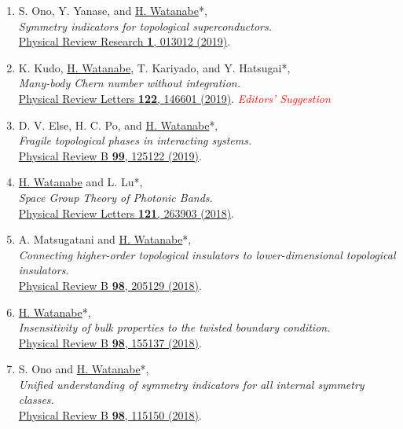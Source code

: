 \documentclass[letterpaper,11pt]{article}
\begin{document}
\begin{enumerate}
\item S. Ono, Y. Yanase, and \underline{H. Watanabe}*, \\\emph{Symmetry indicators for topological superconductors.}\\{\href{https://doi.org/10.1103/PhysRevResearch.1.013012}{Physical Review Research {\bf 1}, 013012 (2019)}.}

\item K. Kudo, \underline{H. Watanabe}, T. Kariyado, and Y. Hatsugai*, \\\emph{Many-body Chern number without integration.}\\{\href{https://doi.org/10.1103/PhysRevLett.122.146601}{Physical Review Letters {\bf 122}, 146601 (2019)}. \emph{\small \textcolor{red}{Editors' Suggestion}}}

\item D. V. Else, H. C. Po, and \underline{H. Watanabe}*, \\\emph{Fragile topological phases in interacting systems.}\\{\href{https://doi.org/10.1103/PhysRevB.99.125122}{Physical Review B {\bf 99}, 125122 (2019)}.}

\item \underline{H. Watanabe} and L. Lu*, \\\emph{Space Group Theory of Photonic Bands.}\\{\href{https://doi.org/10.1103/PhysRevLett.121.263903}{Physical Review Letters {\bf 121}, 263903 (2018)}.}

\item A. Matsugatani and \underline{H. Watanabe}*, \\\emph{Connecting higher-order topological insulators to lower-dimensional topological insulators.}\\{\href{https://doi.org/10.1103/PhysRevB.98.205129}{Physical Review B {\bf 98}, 205129 (2018)}.}

\item \underline{H. Watanabe}*, \\\emph{Insensitivity of bulk properties to the twisted boundary condition.}\\{\href{https://doi.org/10.1103/PhysRevB.98.155137}{Physical Review B {\bf 98}, 155137 (2018)}.}

\item S. Ono and \underline{H. Watanabe}*, \\\emph{Unified understanding of symmetry indicators for all internal symmetry classes.}\\{\href{https://doi.org/10.1103/PhysRevB.98.115150}{Physical Review B {\bf 98}, 115150 (2018)}.}


\end{enumerate}
\end{document}
